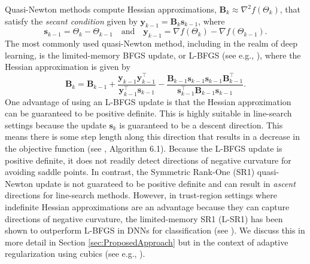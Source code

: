 Quasi-Newton methods  compute Hessian approximations, $\mathbf{B}_{k} \approx \nabla^2 f(\Theta_k)$, that satisfy the \emph{secant condition} given by $\mathbf{y}_{k-1} = \mathbf{B}_{k} \mathbf{s}_{k-1}$, where 
$$
\mathbf{s}_{k-1} = \Theta_{k} - \Theta_{k-1} \quad \text{and} \quad 
\mathbf{y}_{k-1} = \nabla f(\Theta_{k}) - \nabla f(\Theta_{k-1}).
$$
The most commonly used quasi-Newton method, including in the realm of deep learning, is the limited-memory BFGS update, or L-BFGS (see e.g., \citet{Liu1989}), where the Hessian approximation is given by
	\begin{equation}\label{eqn:LBFGS}
		\mathbf{B}_{k} = \mathbf{B}_{k-1} + \frac{\mathbf{y}_{k-1}\mathbf{y}_{k-1}^{\top}}{\mathbf{y}_{k-1}^{\top}\mathbf{s}_{k-1}} - \frac{\mathbf{B}_{k-1} \mathbf{s}_{k-1} \mathbf{s}_{k-1} \mathbf{B}_{k-1}^{\top}}{\mathbf{s}_{k-1}^{\top}\mathbf{B}_{k-1}\mathbf{s}_{k-1}}.	
	\end{equation} 
One advantage of using an L-BFGS update is that the Hessian approximation can be guaranteed to be positive definite. This is highly suitable in line-search settings because the update $\mathbf{s}_k$ is guaranteed to be a descent direction. This means there is some step length along this direction that results in a decrease in the objective function (see \citet{NoceWrig06}, Algorithm 6.1). Because the L-BFGS update is positive definite, it does not readily detect directions of negative curvature for avoiding saddle points.  In contrast, the Symmetric Rank-One (SR1) quasi-Newton update is not guarateed to be positive definite and can result in \emph{ascent} directions for line-search methods.  However, in trust-region settings where indefinite Hessian approximations are an advantage because they can capture directions of negative curvature, the limited-memory SR1 (L-SR1) has been shown to outperform L-BFGS in DNNs for classification (see \citet{Erway2020TrustregionAF}).  We discuss this in more detail in Section \ref{sec:ProposedApproach} but in the context of adaptive regularization using cubics (see e.g., \citet{NesP06}).  

